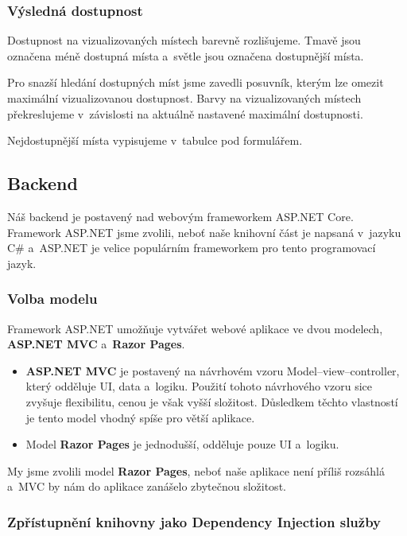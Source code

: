 \subsubsection{Výsledná dostupnost}

Dostupnost na vizualizovaných místech barevně rozlišujeme. Tmavě jsou označena méně dostupná místa a~světle jsou označena dostupnější místa.

Pro snazší hledání dostupných míst jsme zavedli posuvník, kterým lze omezit maximální vizualizovanou dostupnost. Barvy na vizualizovaných místech překreslujeme v~závislosti na aktuálně nastavené maximální dostupnosti.

Nejdostupnější místa vypisujeme v~tabulce pod formulářem.


\subsection{Backend}

Náš backend je postavený nad webovým frameworkem ASP.NET Core. Framework ASP.NET jsme zvolili, neboť naše knihovní část je napsaná v~jazyku C\# a~ASP.NET je velice populárním frameworkem pro tento programovací jazyk.

\subsubsection{Volba modelu}

Framework ASP.NET umožňuje vytvářet webové aplikace ve dvou modelech, \textbf{ASP.NET MVC} a~\textbf{Razor Pages}.

\begin{itemize}
    \item \textbf{ASP.NET MVC} je postavený na návrhovém vzoru Model–view–controller, který odděluje UI, data a~logiku. Použití tohoto návrhového vzoru sice zvyšuje flexibilitu, cenou je však vyšší složitost. Důsledkem těchto vlastností je tento model vhodný spíše pro větší aplikace.
    \item Model \textbf{Razor Pages} je jednodušší, odděluje pouze UI a~logiku.
\end{itemize}

My jsme zvolili model \textbf{Razor Pages}, neboť naše aplikace není příliš rozsáhlá a~MVC by nám do aplikace zanášelo zbytečnou složitost.

\subsubsection{Zpřístupnění knihovny jako Dependency Injection služby}

